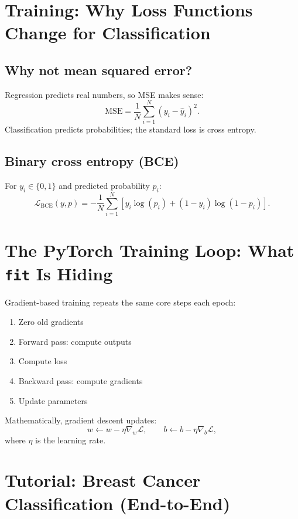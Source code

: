 \section{Training: Why Loss Functions Change for Classification}

\subsection{Why not mean squared error?}
Regression predicts real numbers, so MSE makes sense:
\[
\text{MSE}=\frac{1}{N}\sum_{i=1}^{N}(y_i-\hat{y}_i)^2.
\]
Classification predicts probabilities; the standard loss is cross entropy.

\subsection{Binary cross entropy (BCE)}
For $y_i\in\{0,1\}$ and predicted probability $p_i$:
\[
\mathcal{L}_{\text{BCE}}(y,p)=
-\frac{1}{N}\sum_{i=1}^{N}\left[y_i\log(p_i)+(1-y_i)\log(1-p_i)\right].
\]

\section{The PyTorch Training Loop: What \texttt{fit} Is Hiding}

Gradient-based training repeats the same core steps each epoch:

\begin{tcolorbox}[colframe=orange!70!black,colback=orange!4,title=\textbf{\color{orange!80!black}One epoch = one parameter update cycle}]
\begin{enumerate}[leftmargin=*]
  \item Zero old gradients
  \item Forward pass: compute outputs
  \item Compute loss
  \item Backward pass: compute gradients
  \item Update parameters
\end{enumerate}
\end{tcolorbox}

Mathematically, gradient descent updates:
\[
w \leftarrow w - \eta\nabla_w\mathcal{L},
\qquad
b \leftarrow b - \eta\nabla_b\mathcal{L},
\]
where $\eta$ is the learning rate.

\section{Tutorial: Breast Cancer Classification (End-to-End)}

